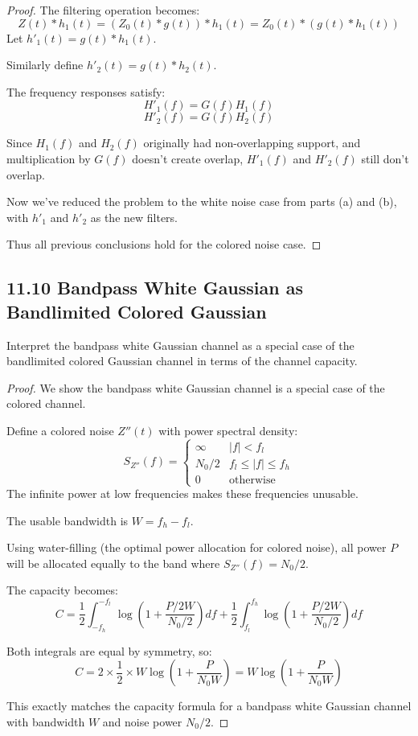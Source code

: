 \documentclass[../main.tex]{subfiles}
\begin{document}
\begin{proof}
The filtering operation becomes:
\[ Z(t)*h_1(t) = (Z_0(t)*g(t))*h_1(t) = Z_0(t)*(g(t)*h_1(t)) \]
Let $h'_1(t) = g(t)*h_1(t)$.

 Similarly define $h'_2(t) = g(t)*h_2(t)$. 

The frequency responses satisfy:
\[ H'_1(f) = G(f)H_1(f) \]
\[ H'_2(f) = G(f)H_2(f) \]

Since $H_1(f)$ and $H_2(f)$ originally had non-overlapping support, and multiplication by $G(f)$ doesn't create overlap, $H'_1(f)$ and $H'_2(f)$ still don't overlap.

Now we've reduced the problem to the white noise case from parts (a) and (b), with $h'_1$ and $h'_2$ as the new filters.

Thus all previous conclusions hold for the colored noise case.

\end{proof}


\subsection*{11.10 Bandpass White Gaussian as Bandlimited Colored Gaussian}
 Interpret the bandpass white Gaussian channel as a special case of the bandlimited colored Gaussian channel in terms of the channel capacity.

\begin{proof}

We show the bandpass white Gaussian channel is a special case of the colored channel.

Define a colored noise $Z''(t)$ with power spectral density:
\[ S_{Z''}(f) = \begin{cases}
\infty & |f| < f_l \\
N_0/2 & f_l \leq |f| \leq f_h \\
0 & \text{otherwise}
\end{cases} \]
The infinite power at low frequencies makes these frequencies unusable.

The usable bandwidth is $W = f_h - f_l$.

Using water-filling (the optimal power allocation for colored noise), all power $P$ will be allocated equally to the band where $S_{Z''}(f) = N_0/2$.

The capacity becomes:
\[ C = \frac{1}{2}\int_{-f_h}^{-f_l} \log\left(1 + \frac{P/2W}{N_0/2}\right)df + \frac{1}{2}\int_{f_l}^{f_h} \log\left(1 + \frac{P/2W}{N_0/2}\right)df \]

Both integrals are equal by symmetry, so:
\[ C = 2 \times \frac{1}{2} \times W \log\left(1 + \frac{P}{N_0W}\right) = W\log\left(1 + \frac{P}{N_0W}\right) \]

This exactly matches the capacity formula for a bandpass white Gaussian channel with bandwidth $W$ and noise power $N_0/2$.

\end{proof}
\end{document}
